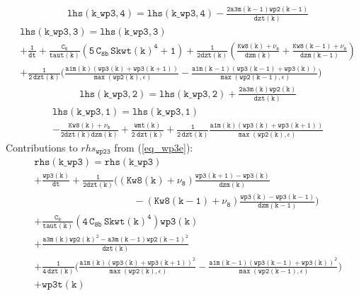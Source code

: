 \documentclass[11pt,fleqn]{article}
\begin{document}
%
\begin{equation}
\begin{split}
& \mathtt{ lhs(k\_wp3,4) = lhs(k\_wp3,4) 
  - \frac{2 a3m(k-1) wp2(k-1)}{dzt(k)}
  }
\end{split}
\end{equation}
%
\begin{equation}
\begin{split}
& \mathtt{ lhs(k\_wp3,3) = lhs(k\_wp3,3) }\\
& \mathtt{
+ \frac{1}{dt}
+ \frac{C_8}{taut(k)}
   \left(  5 \, C_{8b} \, {Skwt(k)}^4 + 1 \right)
+ \frac{1}{2 dzt(k)} \left(  \frac{Kw8(k)+\nu_8}{dzm(k)}
                           + \frac{Kw8(k-1)+\nu_8}{dzm(k-1)} \right)
} \\
& \mathtt{
+ \frac{1}{2 \, dzt(k)}
  \bigg(
    \frac{ a1m(k)
           \left(wp3(k)+wp3(k+1)\right) }
         { \max\left( wp2(k), \epsilon \right) }
  - \frac{ a1m(k-1)
           \left(wp3(k-1)+wp3(k)\right) }
         { \max\left( wp2(k-1), \epsilon \right) }
  \bigg)
}
\end{split}
\end{equation}
%
\begin{equation}
\begin{split}
& \mathtt{ lhs(k\_wp3,2) = lhs(k\_wp3,2)
  + \frac{2 a3m(k) wp2(k)}{dzt(k)}
  }
\end{split}
\end{equation}
%
\begin{equation}
\begin{split}
& \mathtt{ lhs(k\_wp3,1) = lhs(k\_wp3,1) }\\
& \mathtt{
- \frac{Kw8(k)+\nu_8}{2 dzt(k)dzm(k)}
+ \frac{ wmt(k) }{ 2 \ dzt(k) }
+ \frac{1}{2 \, dzt(k)}
  \frac{ a1m(k) \left(wp3(k)+wp3(k+1)\right) }
       { \max\left( wp2(k), \epsilon \right) }
}
\end{split}
\end{equation}
%
Contributions to $rhs_{\mathtt{wp23}}$ from (\ref{eq_wp3e}):
%
\begin{equation}
\begin{split}
& \mathtt{ rhs(k\_wp3) = rhs(k\_wp3) } \\
& \mathtt{
  + \frac{wp3(k)}{dt} 
  + \frac{1}{2dzt(k)}
      \bigg(
              \left(Kw8(k)+\nu_8\right)
              \frac{wp3(k+1)-wp3(k)}{dzm(k)} }  \\
& \mathtt{ \qquad \qquad \qquad \qquad \qquad
            - \left(Kw8(k-1)+\nu_8\right)
              \frac{wp3(k)-wp3(k-1)}{dzm(k-1)}
      \bigg)
  } \\
& \mathtt{
+ \frac{C_8}{taut(k)}
   \left( 4 \, C_{8b} \, {Skwt(k)}^4 \right) wp3(k)
  } \\
& \mathtt{
  + \frac{a3m(k) wp2(k)^2 - a3m(k-1) wp2(k-1)^2 }
         {dzt(k)}
  } \\
& \mathtt{
  + \frac{1}{4 \, dzt(k)}
    \bigg(
      \frac{ a1m(k)
             \left(wp3(k)+wp3(k+1)\right)^2 }
           { \max\left( wp2(k), \epsilon \right) }
     -\frac{ a1m(k-1)
             \left(wp3(k-1)+wp3(k)\right)^2 }
           { \max\left( wp2(k-1), \epsilon \right) }
    \bigg)
  } \\
& \mathtt{
+ wp3t(k)
  }
\end{split}
\end{equation}
\end{document}
